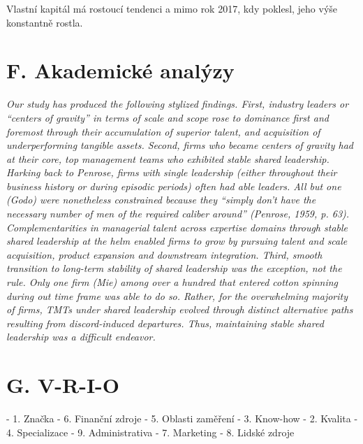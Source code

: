 Vlastní kapitál má rostoucí tendenci a mimo rok 2017, kdy poklesl, jeho výše konstantně rostla.\\

\newpage

\section*{F. Akademické analýzy}
\label{sec:Akademicke analyzy}

\textit{Our study has produced the following stylized findings. First, industry leaders or “centers of gravity” in terms of scale and scope rose to dominance first and foremost through their accumulation of superior talent, and acquisition of underperforming tangible assets. Second, firms who became centers of gravity had at their core, top management teams who exhibited stable shared leadership. Harking back to Penrose, firms with single leadership (either throughout their business history or during episodic periods) often had able leaders. All but one (Godo) were nonetheless constrained because they “simply don’t have the necessary number of men of the required caliber around” (Penrose, 1959, p. 63). Complementarities in managerial talent across expertise domains through stable shared leadership at the helm enabled firms to grow by pursuing talent and scale acquisition, product expansion and downstream integration. Third, smooth transition to long-term stability of shared leadership was the exception, not the rule. Only one firm (Mie) among over a hundred that entered cotton spinning during out time frame was able to do so. Rather, for the overwhelming majority of firms, TMTs under shared leadership evolved through distinct alternative paths resulting from discord-induced departures. Thus, maintaining stable shared leadership was a difficult endeavor.}

\newpage

\section*{G. V-R-I-O}
\label{sec:V-R-I-O}


- 1. Značka
- 6. Finanční zdroje
- 5. Oblasti zaměření
- 3. Know-how
- 2. Kvalita
- 4. Specializace
- 9. Administrativa
- 7. Marketing
- 8. Lidské zdroje

